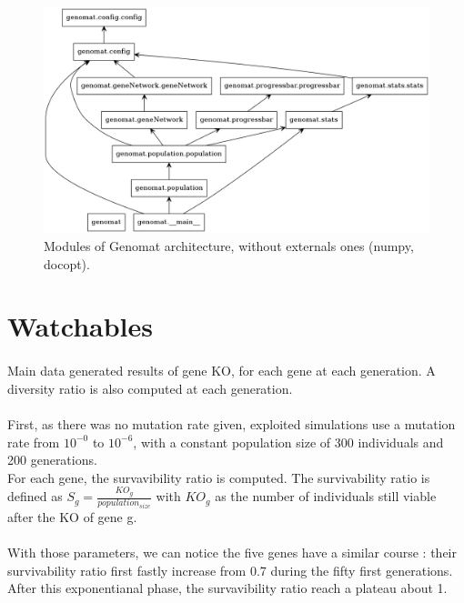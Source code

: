 \documentclass[]{report} %
\begin{document}
        \begin{figure}[H] 
                \centering
                \includegraphics[width=\textwidth]{packages_genomat.png}
                \caption{Modules of Genomat architecture, without externals ones (numpy, docopt).}
                \label{fig:umldiag}
        \end{figure}




\section{Watchables}
    \paragraph*{}
    Main data generated results of gene KO, for each gene at each generation. 
    A diversity ratio is also computed at each generation.
    \paragraph*{}
     First, as there was no mutation rate given, exploited simulations use a mutation rate from $10^{-0}$ to $10^{-6}$, 
     with a constant population size of 300 individuals and 200 generations.\\
     For each gene, the survavibility ratio is computed. The survivability ratio is defined as $S_{g} = \frac{KO_g}{population_{size}}$ 
     with $KO_g$ as the number of individuals still viable after the KO of gene g.
    \paragraph*{}
     With those parameters, we can notice the five genes have a similar course : their survivability ratio first fastly 
     increase from 0.7 during the fifty first generations. After this exponentianal phase, the survavibility ratio reach a plateau about 1. 
\end{document}
